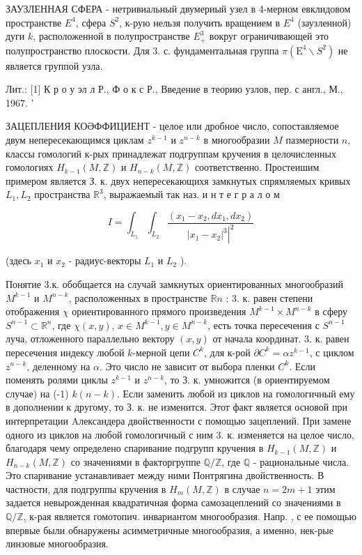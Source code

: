 \documentclass[10pt]{article}
\begin{document}
ЗАУЗЛЕННАЯ СФЕРА - нетривиальный двумериый узел в 4-мерном евклидовом пространстве $E^{4}$, сфера $S^{2}$, к-рую нельзя получить вращением в $E^{4}$ (заузленной) дуги $k$, расположенной в полупространстве $E_{+}^{3}$ вокруг ограничивающей это полупространство плоскости. Для 3. с. фундаментальная группа $\pi\left(\mathrm{E}^{4} \backslash S^{2}\right)$ не является группой узла.



Лит.: [1] К р о у эл л Р., Ф о к с Р., Введение в теорию узлов, пер. с англ., М., 1967̈. '



ЗАЦЕПЛЕНИЯ КОӘФФИЦИЕНТ - целое или дробное число, сопоставляемое двум непересекающимся циклам $z^{k-1}$ и $z^{n-k}$ в многообразии $M$ пазмерности $n$, классы гомологий к-рых принадлежат подгруппам кручения в целочисленных гомологиях $H_{k-1}(M, \mathbb{Z})$ и $H_{n-k}(M, \mathbb{Z})$ соответственно. Простеишим примером является З. к. двух непересекающихя замкнутых спрямляемых кривых $L_{1}, L_{2}$ пространства $\mathbb{R}^{3}$, выражаемый так наз. и н т е г р а л о м



\[

I=\int_{L_{1}} \int_{L_{2}} \frac{\left(x_{1}-x_{2}, d x_{1}, d x_{2}\right)}{\left.\left|x_{1}-x_{2}\right|^{3}\right|^{2}}

\]



(здесь $x_{1}$ и $x_{2}$ - радиус-векторы $L_{1}$ и $L_{2}$ ).



Понятие 3.к. обобщается на случай замкнутых ориентированных многообразий $M^{k-1}$ и $M^{n-k}$, расположенных в пространстве $\mathbb{R} n$ : 3. к. равен степени отображения $\chi$ ориентированного прямого произведения $M^{k-1} \times M^{n-k}$ в сферу $S^{n-1} \subset \mathbb{R}^{n}$, где $\chi(x, y)$, $x \in M^{k-1}, y \in M^{n-k}$, есть точка пересечения с $S^{n-1}$ луча, отложенного параллельно вектору $(x, y)$ от начала координат. 3. к. равен пересечения индексу любой $k$-мерной цепи $C^{k}$, для к-рой $\partial C^{k}=\alpha z^{k-1}$, с циклом $z^{n-k}$, деленному на $\alpha$. Это число не зависит от выбора пленки $C^{k}$. Если поменять ролями циклы $z^{k-1}$ и $z^{n-k}$, то З. к. умножится (в ориентируемом случае) на (-1) $k(n-k)$. Если заменить любой из циклов на гомологичный ему в дополнении к другому, то З. к. не изменится. Этот факт является основой при интерпретации Aлександера двойственности с помощью зацеплений. При замене одного из циклов на любой гомологичный с ним 3. к. изменяется на целое число, благодаря чему определено спаривание подгрупп кручения в $H_{k-1}(M, \mathbb{Z})$ и $H_{n-k}(M, \mathbb{Z})$ со значениями в факторгруппе $\mathbb{Q} / \mathbb{Z}$, где $\mathbb{Q}$ - рациональные числа. Это спаривание устанавливает между ними Понтрягина двойственность. В частности, для подгруппы кручения в $H_{m}(M, \mathbb{Z})$ в случае $n=2 m+1$ этим задается невырожденная квадратичная форма самозацеплений со значениями в $\mathbb{Q} / \mathbb{Z}$, к-рая является гомотопич. инвариантом многообразия. Напр. , с ее помощью впервые были обнаружены асимметричные многообразия, а именно, нек-рые линзовые многообразия.
\end{document}
